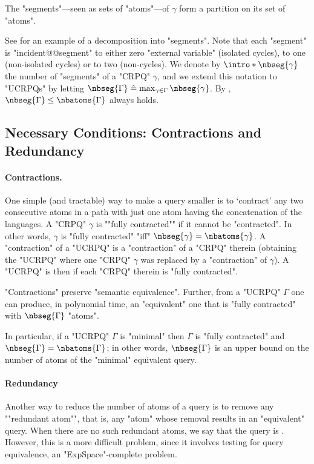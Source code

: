 \begin{fact}
	\AP\label{fact:partition-into-segments}
	The "segments"---seen as sets of "atoms"---of $\gamma$ form a partition on its set of "atoms".
\end{fact}

See  for an example of a decomposition into "segments".
Note that each "segment" is "incident@@segment" to either zero "external variable" (isolated cycles),
to one (non-isolated cycles) or to two (non-cycles).
We denote by \AP$\intro*\nbseg{\gamma}$ the number of "segments" of a "CRPQ" $\gamma$,
and we extend this notation to "UCRPQs" by letting $\nbseg{\Gamma} \defeq
\max_{\gamma \in \Gamma}{\nbseg{\gamma}}$. By , $\nbseg{\Gamma}\leq \nbatoms{\Gamma}$ always holds.

\subsection{Necessary Conditions: Contractions and Redundancy}

\paragraph{Contractions.}
One simple (and tractable) way to make a query smaller is to `contract' any two consecutive atoms in a path with just one atom having the concatenation of the languages.
A "CRPQ" $\gamma$ is \AP""fully contracted"" if it cannot be "contracted".
In other words, $\gamma$ is "fully contracted" "iff" $\nbseg{\gamma} = \nbatoms{\gamma}$.
A "contraction" of a "UCRPQ" is a "contraction" of a "CRPQ" therein (obtaining the "UCRPQ" where one "CRPQ" $\gamma$ was replaced by a "contraction" of $\gamma$). A "UCRPQ" is then  if each "CRPQ" therein is "fully contracted".

\begin{fact}
	\AP\label{fact:produce-fully-contracted}
	"Contractions" preserve "semantic equivalence". Further, from a "UCRPQ" $\Gamma$ one can produce, in polynomial time, an "equivalent" one that is "fully contracted" with $\nbseg{\Gamma}$ "atoms".
\end{fact}

In particular, if a "UCRPQ" $\Gamma$ is "minimal" then $\Gamma$ is "fully contracted" and $\nbseg{\Gamma} = \nbatoms{\Gamma}$; in other words, $\nbseg{\Gamma}$ is an upper bound on the number of atoms of the "minimal" equivalent query.

\paragraph{Redundancy}
Another way to reduce the number of atoms of a query is to remove any \AP""redundant atom"", that is, any "atom" whose removal results in an "equivalent" query. 
When there are no such redundant atoms, we say that the query is .
However, this is a more difficult problem, since it involves testing for query equivalence, an "ExpSpace"-complete problem.

